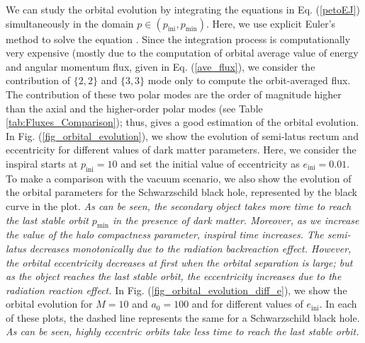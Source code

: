 \documentclass[11pt]{article}
\begin{document}
We can study the orbital evolution by integrating the equations in Eq. (\ref{petoEJ}) simultaneously in the domain $p\in (p_{\textrm{ini}}, p_{\textrm{min}})$. Here, we use explicit Euler's method to solve the equation \cite{holmes2006introduction}. Since the integration process is computationally very expensive (mostly due to the computation of orbital average value of energy and angular momentum flux, given in Eq. (\ref{ave_flux}), we consider the contribution of $\{2,2\}$ and $\{3,3\}$ mode only to compute the orbit-averaged flux. The contribution of these two polar modes are the order of magnitude higher than the axial and the higher-order polar modes (see Table
\ref{tab:Fluxes_Comparison}); thus, gives a good estimation of the orbital evolution. In Fig. (\ref{fig_orbital_evolution}), we show the evolution of semi-latus rectum and eccentricity for different values of dark matter parameters. Here, we consider the inspiral starts at $p_{\textrm{ini}}=10$ and set the initial value of eccentricity as $e_{\textrm{ini}}=0.01$. To make a comparison with the vacuum scenario, we also show the evolution of the orbital parameters for the Schwarzschild black hole, represented by the black curve in the plot. \textit{As can be seen, the secondary object takes more time to reach the last stable orbit $p_{\textrm{min}}$ in the presence of dark matter. Moreover, as we increase the value of the halo compactness parameter, inspiral time increases. The semi-latus decreases monotonically due to the radiation backreaction effect. However, the orbital eccentricity decreases at first when the orbital separation is large; but as the object reaches the last stable orbit, the eccentricity increases due to the radiation reaction effect.} In Fig. (\ref{fig_orbital_evolution_diff_e}), we show the orbital evolution for $M=10$ and $a_0=100$ and for different values of $e_{\textrm{ini}}$. In each of these plots, the dashed line represents the same for a Schwarzschild black hole. \textit{As can be seen, highly eccentric orbits take less time to reach the last stable orbit.}
\end{document}
